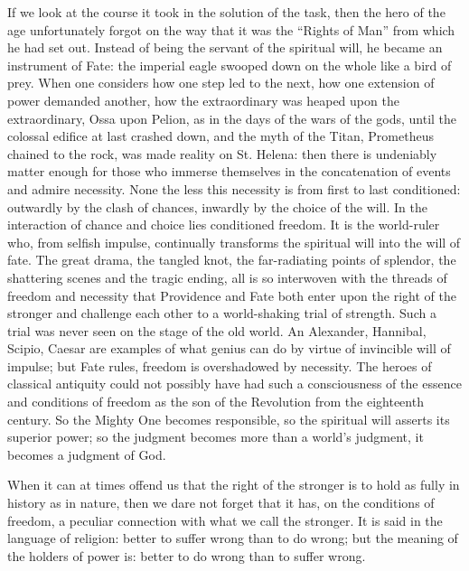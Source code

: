 \documentclass[12pt,a4paper,openany]{book}
\newcommand{\opage}[1]{\marginnote{\footnotesize\textit{[#1]}}}
\begin{document}
If we look at the course it took in the solution of the task,
then the hero of the age unfortunately forgot on the way
that it was the ``Rights of Man'' from which he had
set out. Instead of being the servant of the spiritual will, he became
an instrument of Fate: the imperial eagle swooped down on
the whole like a bird of prey. When one considers how
one step led to the next, how one extension of
power demanded another, how the extraordinary
was heaped upon the extraordinary, Ossa upon
Pelion, as in the days of the wars of the gods, until the colossal
edifice at last crashed down, and the myth of
the Titan, Prometheus chained to the rock, was
made reality on St. Helena: then there is undeniably
matter enough for those who immerse themselves in the
concatenation of events and admire necessity. None the
less this necessity is from first to
last conditioned: outwardly by the clash of chances, inwardly
by the choice of the will. In the interaction of chance
and choice lies conditioned freedom. It is the
\setcounter{footnote}{0}%
\opage{95}world-ruler who, from selfish impulse, continually transforms the spiritual will
into the will of fate. The great drama, the tangled
knot, the far-radiating points of splendor, the
shattering scenes and the tragic ending, all is so
interwoven with the threads of freedom and necessity
that Providence and Fate both enter upon the
right of the stronger and challenge each other to a world-shaking
trial of strength. Such a trial was never seen
on the stage of the old world. An Alexander,
Hannibal, Scipio, Caesar are examples of what genius
can do by virtue of invincible will of impulse; but Fate
rules, freedom is overshadowed by necessity.
The heroes of classical antiquity could not possibly have had
such a consciousness of the essence and conditions of freedom
as the son of the Revolution from the eighteenth century.
So the Mighty One becomes responsible, so the spiritual will
asserts its superior power; so the judgment becomes
more than a world's judgment, it becomes a judgment of God.

When it can at times offend us that the right of the stronger
is to hold as fully in history as in nature,
then we dare not forget that it has, on the conditions
of freedom, a peculiar connection with what we call
the stronger. It is said in the language of religion: better
to suffer wrong than to do wrong; but the
meaning of the holders of power is: better to do wrong than to suffer wrong.
\end{document}
